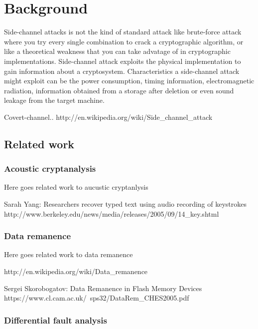 \chapter{Background}
\label{chp:background} 

Side-channel attacks is not the kind of standard attack like brute-force attack where you try every single combination to crack a cryptographic algorithm, or like a theoretical weakness that you can take advatage of in cryptographic implementations. 
Side-channel attack exploits the physical implementation to gain information about a cryptosystem.
Characteristics a side-channel attack might exploit can be the power consumption, timing information, electromagnetic radiation, information obtained from a storage after deletion or even sound leakage from the target machine. 

Covert-channel.. 
http://en.wikipedia.org/wiki/Side\_channel\_attack


\section{Related work}\label{sec:related_work}

\subsection{Acoustic cryptanalysis}\label{sec:acoustic_cryptanalysis}

Here goes related work to aucustic cryptanlysis

Sarah Yang: Researchers recover typed text using audio recording of keystrokes 
http://www.berkeley.edu/news/media/releases/2005/09/14\_key.shtml


\subsection{Data remanence}\label{sec:data_remanence}

Here goes related work to data remanence

http://en.wikipedia.org/wiki/Data\_remanence

Sergei Skorobogatov: Data Remanence in Flash Memory Devices
https://www.cl.cam.ac.uk/~sps32/DataRem\_CHES2005.pdf

\subsection{Differential fault analysis}\label{sec:differential_fault_analysis}

